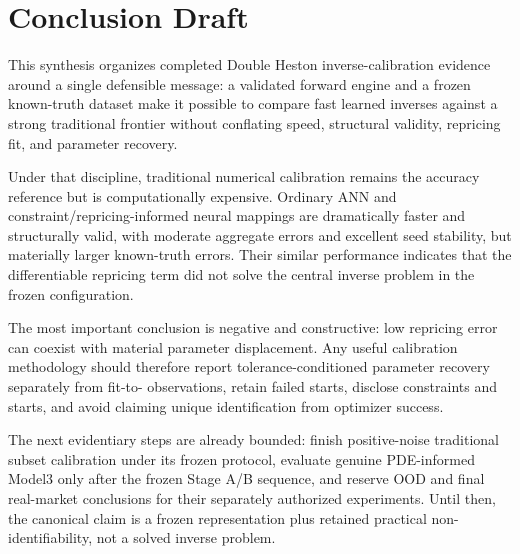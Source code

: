 \section{Conclusion Draft}
\label{sec:conclusion}

This synthesis organizes completed Double Heston inverse-calibration evidence around a
single defensible message: a validated forward engine and a frozen known-truth dataset
make it possible to compare fast learned inverses against a strong traditional frontier
without conflating speed, structural validity, repricing fit, and parameter recovery.

Under that discipline, traditional numerical calibration remains the accuracy reference
but is computationally expensive. Ordinary ANN and constraint/repricing-informed neural
mappings are dramatically faster and structurally valid, with moderate aggregate errors
and excellent seed stability, but materially larger known-truth errors. Their similar
performance indicates that the differentiable repricing term did not solve the central
inverse problem in the frozen configuration.

The most important conclusion is negative and constructive: low repricing error can
coexist with material parameter displacement. Any useful calibration methodology should
therefore report tolerance-conditioned parameter recovery separately from fit-to-
observations, retain failed starts, disclose constraints and starts, and avoid claiming
unique identification from optimizer success.

The next evidentiary steps are already bounded: finish positive-noise traditional subset
calibration under its frozen protocol, evaluate genuine PDE-informed Model3 only after
the frozen Stage A/B sequence, and reserve OOD and final real-market conclusions for their
separately authorized experiments. Until then, the canonical claim is a frozen
representation plus retained practical non-identifiability, not a solved inverse problem.
